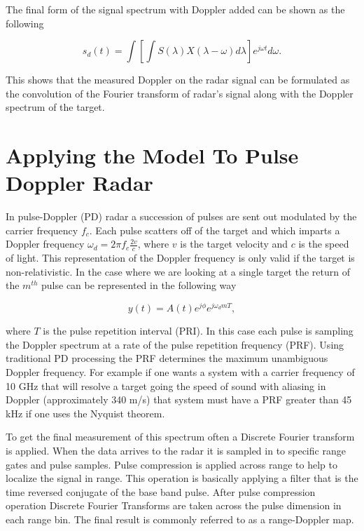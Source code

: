The final form of the signal spectrum with Doppler added can be shown as the following

\begin{equation}
\label{finalDop}
s_d(t) = \int \left[\int S(\lambda)X(\lambda-\omega)d\lambda\right] e^{j\omega t}d\omega.
\end{equation}

\noindent This shows that the measured Doppler on the radar signal can be formulated as the convolution of the Fourier transform of radar's signal along with the Doppler spectrum of the target.

\section*{Applying the Model To Pulse Doppler Radar}

In pulse-Doppler (PD) radar a succession of pulses are sent out modulated by the carrier frequency $f_c$.  Each pulse scatters off of the target and which imparts a Doppler frequency $\omega_d = 2\pi f_c \frac{2v}{c}$, where $v$ is the target velocity and $c$ is the speed of light.  This representation of the Doppler frequency is only valid if the target is non-relativistic.  In the case where we are looking at a single target the return of the $m^{th}$ pulse can be represented in the following way\cite{richards:fundamentalsigproc}

\begin{equation}
\label{pdpulse}
y(t) =  A(t)e^{j\phi}e^{j\omega_dmT},
\end{equation}

\noindent where $T$ is the pulse repetition interval (PRI).  In this case each pulse is sampling the Doppler spectrum at a rate of the pulse repetition frequency (PRF).  Using traditional PD processing the PRF determines the maximum unambiguous Doppler frequency.  For example if one wants a system with a carrier frequency of 10 GHz that will resolve a target going the speed of sound with aliasing in Doppler (approximately 340 m/s) that system must have a PRF greater than 45 kHz if one uses the Nyquist theorem.   

To get the final measurement of this spectrum often a Discrete Fourier transform is applied.  When the data arrives to the radar it is sampled in to specific range gates and pulse samples.  Pulse compression is applied across range to help to localize the signal in range.  This operation is basically applying a filter that is the time reversed conjugate of the base band pulse.  After pulse compression operation Discrete Fourier Transforms are taken across the pulse dimension in each range bin.   The final result is commonly referred to as a range-Doppler map.


